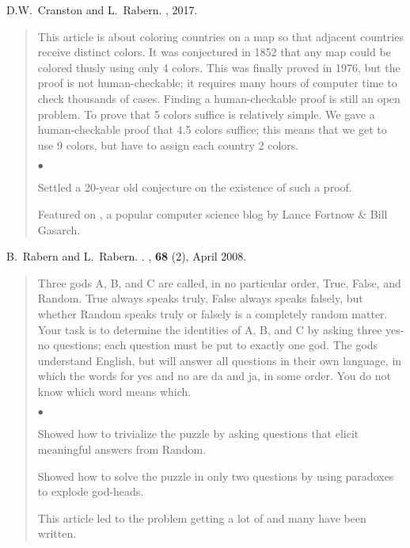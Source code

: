 \documentclass[10pt]{article}
\newcommand{\squishlist}{
   \begin{list}{$\bullet$}
    { \setlength{\itemsep}{0pt}    \setlength{\parsep}{0pt}
      \setlength{\topsep}{4.5pt}     \setlength{\partopsep}{0pt}
      \setlength{\leftmargin}{2em} \setlength{\labelwidth}{1.5em}
      \setlength{\labelsep}{0.5em} } }
\newcommand{\squishend}{
    \end{list}  }
\begin{document}
\vspace{0.25in}
{\large
D.W.~Cranston and L.~Rabern.
\newblock \href{https://landon.github.io/graphdata/Papers/planar%209%20halves.pdf}{\color{blue}{Planar graphs are $\frac92$-colorable}}
, 2017.}

\begin{quote}
This article is about coloring countries on a map so that adjacent countries receive distinct colors.  It was conjectured
in 1852 that any map could be colored thusly using only 4 colors.  This was finally proved in 1976, but the proof is not human-checkable;
it requires many hours of computer time to check thousands of cases.  Finding a human-checkable proof is still an open problem.
To prove that 5 colors suffice is relatively simple.  We gave a human-checkable proof that 4.5 colors suffice; this means that
we get to use 9 colors, but have to assign each country 2 colors.

\squishlist
	\item Settled a 20-year old conjecture on the existence of such a proof.
	\item Featured on 
\href{http://blog.computationalcomplexity.org/2015/10/a-human-readable-proof-that-every.html}{\color{blue}{Computational Complexity}}, a popular computer science blog by Lance Fortnow \& Bill Gasarch.
\squishend
\end{quote}

\vspace{0.5in}
{\large
B.~Rabern and L.~Rabern.
\newblock \href{http://brianrabern.net/sshlpe.pdf}{\color{blue}{A simple solution to the hardest logic puzzle ever}}. 
, \textbf{68} (2), April 2008.}

\begin{quote}
Three gods A, B, and C are called, in no particular order, True, False, and Random. 
True always speaks truly, False always speaks falsely, but whether Random speaks truly or falsely is a completely random matter. 
Your task is to determine the identities of A, B, and C by asking three yes-no questions; each question must be put to exactly one god. 
The gods understand English, but will answer all questions in their own language, in which the words for yes and no are da and ja, in some order. 
You do not know which word means which.
	  \squishlist
		\item Showed how to trivialize the puzzle by asking questions that elicit meaningful answers from Random.
		\item Showed how to solve the puzzle in only two questions by using paradoxes to explode god-heads.
		\item This article led to the problem getting a lot of \href{http://brianrabern.net/New_Scientist_HLPE.pdf}{\color{blue}{press}} 
		and many \href{https://scholar.google.com/scholar?oi=bibs&hl=en&cites=14941881349355280851}{\color{blue}{follow-up papers}} have been written.
      \squishend
\end{quote}
\end{document}
